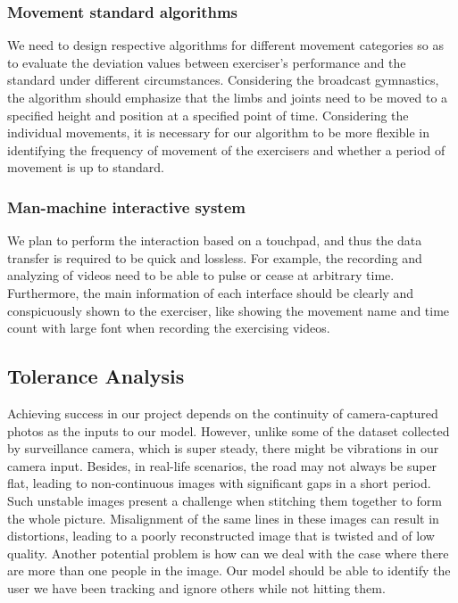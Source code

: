 \subsubsection{Movement standard algorithms}
We need to design respective algorithms for different movement categories so as to evaluate the deviation values between exerciser’s performance and the standard under different circumstances. Considering the broadcast gymnastics, the algorithm should emphasize that the limbs and joints need to be moved to a specified height and position at a specified point of time. Considering the individual movements, it is necessary for our algorithm to be more flexible in identifying the frequency of movement of the exercisers and whether a period of movement is up to standard.

\subsubsection{Man-machine interactive system}
We plan to perform the interaction based on a touchpad, and thus the data transfer is required to be quick and lossless. For example, the recording and analyzing of videos need to be able to pulse or cease at arbitrary time. Furthermore, the main information of each interface should be clearly and conspicuously shown to the exerciser, like showing the movement name and time count with large font when recording the exercising videos.


\subsection{Tolerance Analysis}
Achieving success in our project depends on the continuity of camera-captured photos as the inputs to our model. However, unlike some of the dataset collected by surveillance camera, which is super steady, there might be vibrations in our camera input. Besides, in real-life scenarios, the road may not always be super flat, leading to non-continuous images with significant gaps in a short period. Such unstable images present a challenge when stitching them together to form the whole picture. Misalignment of the same lines in these images can result in distortions, leading to a poorly reconstructed image that is twisted and of low quality.
Another potential problem is how can we deal with the case where there are more than one people in the image. Our model should be able to identify the user we have been tracking and ignore others while not hitting them.

